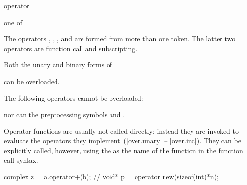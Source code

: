 \begin{bnf}
\br
     operator
\end{bnf}

\begin{bnf}
\obeyspaces
{} \textnormal{one of}\br
    \br
    \terminal{!        +        -        *        /        \%        \caret{}        \&        |}\br
    \terminal{=        +=       -=       *=       /=       \%=       \caret{}=       \&=       |=}\br
    \terminal{==       !=       <        >        <=       >=       <=>      \&\&       ||}\br
    \terminal{<<       >>       <<=      >>=      ++       --       ,}\br
\end{bnf}
\begin{note}
The operators
,
,
\tcode{()},
and
\tcode{[]}
are formed from more than one token.
The latter two operators are function call
and subscripting.
\end{note}
%
%

\pnum
Both the unary and binary forms of
\begin{ncsimplebnf}\obeyspaces
\terminal{+      -      *      \&}
\end{ncsimplebnf}
can be overloaded.

\pnum
{}%
The following operators cannot be overloaded:
\begin{ncsimplebnf}\obeyspaces
{}
\end{ncsimplebnf}
nor can the preprocessing symbols
\tcode{\#}
and
\tcode{\#\#}.

\pnum
{}%
Operator functions are usually not called directly; instead they are invoked
to evaluate the operators they implement~(\ref{over.unary} -- \ref{over.inc}).
They can be explicitly called, however, using the
as the name of the function in the function call syntax.
\begin{example}

\begin{codeblock}
complex z = a.operator+(b);     // 
void* p = operator new(sizeof(int)*n);
\end{codeblock}
\end{example}

